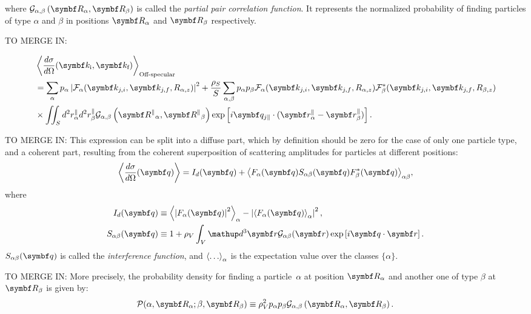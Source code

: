 where $\ppcf{\alpha}{\beta}{R}$ is called the \emph{partial pair correlation function}. It represents the normalized probability of finding particles of type $\alpha$ and $\beta$ in positions $\v{R}_\alpha$ and $\v{R}_\beta$ respectively.

TO MERGE IN:

\begin{align*}
  & \bra \frac{d\sigma}{d\Omega}(\k_\ti,\k_\tf) \ket_{\text{Off-specular}}  \\
  & = \sum_\alpha p_\alpha \left\lvert \curlf_\alpha(\k_{j,i},\k_{j,f}, R_{\alpha,z})\right\rvert ^2 + \frac{\rho_S}{S}\sum_{\alpha,\beta} p_\alpha p_\beta \curlf_\alpha (\k_{j,i},\k_{j,f}, R_{\alpha,z})\curlf_\beta^*(\k_{j,i},\k_{j,f}, R_{\beta,z}) \\
  & \times \iint_S d^2r_\alpha^\plll d^2r_\beta^\plll \ppcf{\alpha}{\beta}{R^\plll} \exp \left[ i\v{q}_{j\plll}\cdot (\r_\alpha^\plll - \r_\beta^\plll ) \right].
\end{align*}


TO MERGE IN:
This expression can be split into a diffuse part, which by definition should be zero for the case of only one particle type, and a coherent part, resulting from the coherent superposition of scattering amplitudes for particles at different positions:
\begin{equation*}
  \bra \frac{d\sigma}{d\Omega}(\q) \ket
  = I_d(\q) + {\bra F_\alpha (\q ) S_{\alpha\beta} (\q) F_\beta^* (\q)
               \ket}_{\alpha\beta},
\end{equation*}
where
\begin{align*}
  I_d(\q) &
  \equiv {\bra\left\rvert F_\alpha (\q) \right\rvert^2\ket}_{\alpha}
       - \left\lvert {\bra F_\alpha (\q)\ket}_{\alpha} \right\rvert^2, \\
  S_{\alpha\beta} (\q) &\equiv 1 + \rho_V \int_V \d^3\r\mathcal{G}_{\alpha\beta}(\r)
                       \exp \left[ i\q\cdot \r \right].
\end{align*}
$S_{\alpha\beta} (\q)$ is called the \emph{interference function},
and $\bra\dotso\ket_\alpha$ is the expectation value over the classes $\lbrace \alpha\rbrace$.


TO MERGE IN:
More precisely, the probability density for finding a particle~$\alpha$
at position $\v{R}_\alpha$ and another one of type $\beta$ at $\v{R}_\beta$ is given by:
\begin{equation*}
  \mathcal{P}(\alpha, \v{R}_\alpha ; \beta , \v{R}_\beta ) \equiv \rho_V^2 p_\alpha p_\beta \ppcf{\alpha}{\beta}{R}.
\end{equation*}


